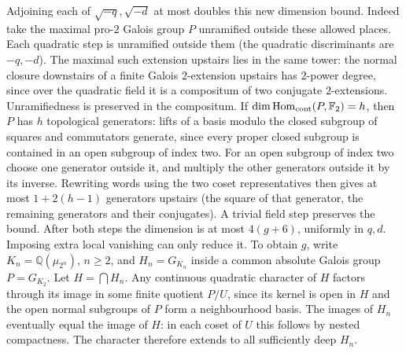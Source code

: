 \documentclass[11pt]{amsart}
\theoremstyle{definition}
\theoremstyle{remark}
\begin{document}
Adjoining each of $\sqrt{-q},\sqrt{-d}$ at most doubles this
new dimension bound. Indeed take the maximal pro-$2$ Galois group
$P$ unramified outside these allowed places. Each quadratic step is
unramified outside them (the quadratic discriminants are $-q,-d$).
The maximal such extension upstairs lies in the same tower: the
normal closure downstairs of a finite Galois $2$-extension upstairs
has $2$-power degree, since over the quadratic field it is a compositum
of two conjugate $2$-extensions. Unramifiedness is preserved in the
compositum. If $\dim\operatorname{Hom}_{\rm cont}(P,\mathbb F_2)=h$,
then $P$ has $h$ topological generators: lifts of a basis modulo the
closed subgroup of squares and commutators generate, since every
proper closed subgroup is contained in an open subgroup of index two.
For an open subgroup of index two choose one generator outside it,
and multiply the other generators outside it by its inverse.
Rewriting words using the two coset representatives then gives at
most $1+2(h-1)$ generators upstairs (the square of that generator,
the remaining generators and their conjugates). A trivial field step
preserves the bound. After both steps the dimension is at most
$4(g+6)$, uniformly in $q,d$. Imposing extra local vanishing can
only reduce it. To obtain $g$, write $K_n=\mathbb Q(\mu_{2^n})$, $n\ge2$,
and $H_n=G_{K_n}$ inside a common absolute Galois group $P=G_{K_2}$.
Let $H=\bigcap H_n$. Any continuous quadratic character of $H$
factors through its image in some finite quotient $P/U$, since its
kernel is open in $H$ and the open normal subgroups of $P$ form a
neighbourhood basis. The images of $H_n$ eventually equal the image
of $H$: in each coset of $U$ this follows by nested compactness.
The character therefore extends to all sufficiently deep $H_n$.
\end{document}

